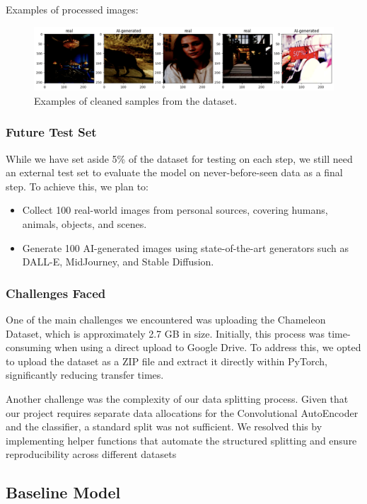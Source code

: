 \documentclass{article} %
\begin{document}
Examples of processed images:
\begin{figure}[h]
    \centering
    \includegraphics[width=1\textwidth]{figs/data_examples.png}
    \caption{Examples of cleaned samples from the dataset.}
    \label{fig:cleaned_sample}
\end{figure}

\subsubsection{Future Test Set}
While we have set aside 5\% of the dataset for testing on each step, we still need an external test set to evaluate the model on never-before-seen data as a final step. To achieve this, we plan to:

\begin{itemize}
    \item Collect 100 real-world images from personal sources, covering humans, animals, objects, and scenes.
    \item Generate 100 AI-generated images using state-of-the-art generators such as DALL-E, MidJourney, and Stable Diffusion.
\end{itemize}

\subsubsection{Challenges Faced}
One of the main challenges we encountered was uploading the Chameleon Dataset, which is approximately 2.7 GB in size. Initially, this process was time-consuming when using a direct upload to Google Drive. To address this, we opted to upload the dataset as a ZIP file and extract it directly within PyTorch, significantly reducing transfer times.

Another challenge was the complexity of our data splitting process. Given that our project requires separate data allocations for the Convolutional AutoEncoder and the classifier, a standard split was not sufficient. We resolved this by implementing helper functions that automate the structured splitting and ensure reproducibility across different datasets

\subsection{Baseline Model}
\end{document}
